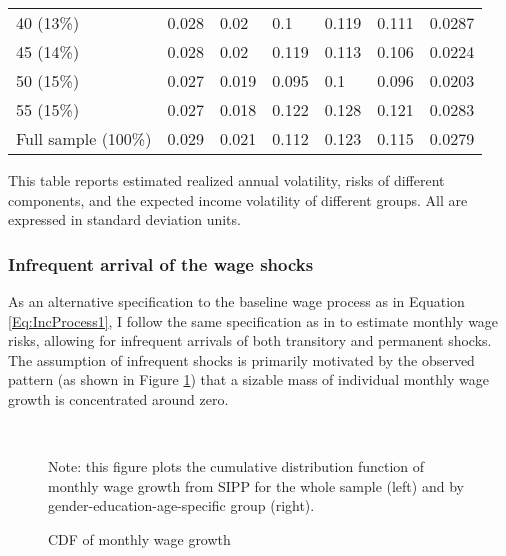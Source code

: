 \begin{table}
{\begin{tabular}{lllllll}
40 (13\%)              & 0.028      & 0.02       & 0.1                & 0.119        & 0.111 & 0.0287 \\
45 (14\%)              & 0.028      & 0.02       & 0.119              & 0.113        & 0.106 & 0.0224 \\
50 (15\%)              & 0.027      & 0.019      & 0.095              & 0.1          & 0.096 & 0.0203 \\
55 (15\%)              & 0.027      & 0.018      & 0.122              & 0.128        & 0.121 & 0.0283 \\
\hline 
Full sample (100\%)          & 0.029      & 0.021      & 0.112              & 0.123        & 0.115 & 0.0279 \\
\hline \hline 
\end{tabular}

}
	\begin{flushleft} This table reports estimated realized annual volatility, risks of different components, and the expected income volatility of different groups. All are expressed in standard deviation units.\end{flushleft}
\end{table}


\subsubsection{Infrequent arrival of the wage shocks}

As an alternative specification to the baseline wage process as in Equation \ref{Eq:IncProcess1}, I follow the same specification as in \cite{druedahl2021high} to estimate monthly wage risks, allowing for infrequent arrivals of both transitory and permanent shocks. The assumption of infrequent shocks is primarily motivated by the observed pattern (as shown in Figure \ref{fig:high-freq-cdf}) that a sizable mass of individual monthly wage growth is concentrated around zero. 

\begin{figure}[!ht]
    	\caption{CDF of monthly wage growth}
    	\label{fig:high-freq-cdf}
    	\begin{center}
    	 \\ 
    	\end{center}
    	\begin{flushleft}Note:  this figure plots the cumulative distribution function of monthly wage growth from SIPP for the whole sample (left) and by gender-education-age-specific group (right).  \end{flushleft}
    \end{figure}
    
